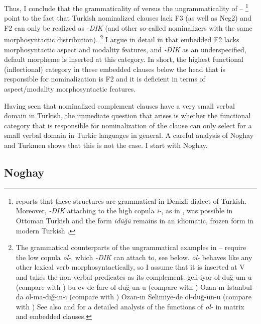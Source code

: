 \documentclass[output=paper]{langsci/langscibook}
\begin{document}
Thus, I conclude that the grammaticality of  versus the ungrammaticality of --%
\footnote{%
    \citet{Sag2013} reports that these structures are grammatical in Denizli dialect of Turkish. 
    Moreover, \textit{-DIK} attaching to the high copula \textit{i-}, as in , 
    was possible in Ottoman Turkish \citep[195]{Kerslake1988} 
    and the form \textit{idüğü} remains in an idiomatic, frozen form in modern Turkish \citep{Banguoglu1990,Kelepir2013}.
} 
point to the fact that Turkish nominalized clauses lack F3 (as well as Neg2) and F2 can only be realized as \textit{-DIK} 
(and other so-called nominalizers with the same morphosyntactic distribution).%
\footnote{%
    The grammatical counterparts of the ungrammatical examples in -- require the low copula \textit{ol-}, 
    which \textit{-DIK} can attach to, see  below. 
    \textit{ol-} behaves like any other lexical verb morphosyntactically, so I assume that it is inserted at V 
    and takes the non-verbal predicates as its complement.
    \ea
        \label{kelepirex:key:i:ftn11}
        \ea geli-iyor ol-duğ-um-u (compare with )  
        \ex bu ev-de fare ol-duğ-un-u (compare with )
        \ex Ozan-ın İstanbul-da ol-ma-dığ-ın-ı (compare with )
        \ex Ozan-ın Selimiye-de ol-duğ-un-u (compare with )
        \z 
    \z 
    See also \citet{Kerslake1988} and \citet{Goksel2001} for a detailed analysis of the functions of \textit{ol-} in matrix and embedded clauses.
} 
I argue in detail in \citet{Kelepir2013} that embedded F2 lacks morphosyntactic aspect and modality features, 
and \textit{-DIK} as an underspecified, default morpheme is inserted at this category. 
In short, the highest functional (inflectional) category in these embedded clauses below the head 
that is responsible for nominalization is F2 and it is deficient in terms of aspect/modality morphosyntactic features.

Having seen that nominalized complement clauses have a very small verbal domain in Turkish, 
the immediate question that arises is whether the functional category that is responsible for nominalization of the clause 
can only select for a small verbal domain in Turkic languages in general. 
A careful analysis of Noghay and Turkmen shows that this is not the case. 
I start with Noghay.

\subsection{Noghay} 
\label{kelepirsec:key:2.3}
\end{document}
